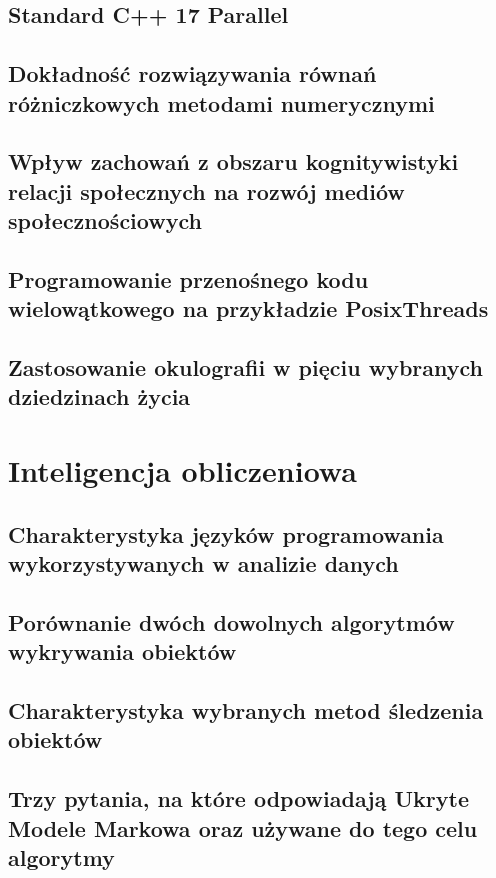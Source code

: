 \documentclass[wi]{zut}
\begin{document}
\subsection{Standard C++ 17 Parallel}

\subsection{Dokładność rozwiązywania równań różniczkowych metodami numerycznymi}

\subsection{Wpływ zachowań z obszaru kognitywistyki relacji społecznych na rozwój mediów społecznościowych}

\subsection{Programowanie przenośnego kodu wielowątkowego na przykładzie PosixThreads}

\subsection{Zastosowanie okulografii w pięciu wybranych dziedzinach życia}

\section{Inteligencja obliczeniowa}

\subsection{Charakterystyka języków programowania wykorzystywanych w analizie danych}

\subsection{Porównanie dwóch dowolnych algorytmów wykrywania obiektów}

\subsection{Charakterystyka wybranych metod śledzenia obiektów}

\subsection{Trzy pytania, na które odpowiadają Ukryte Modele Markowa oraz używane do tego celu algorytmy}
\end{document}
